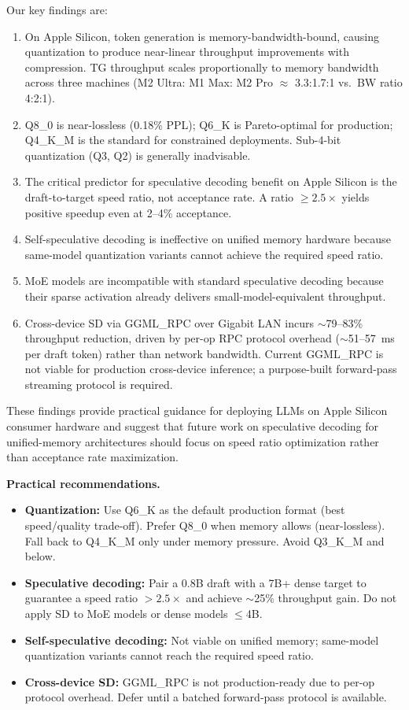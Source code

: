\documentclass[11pt,a4paper]{article}
\begin{document}
Our key findings are:
\begin{enumerate}
  \item On Apple Silicon, token generation is memory-bandwidth-bound, causing
    quantization to produce near-linear throughput improvements with compression.
    TG throughput scales proportionally to memory bandwidth across three
    machines (M2 Ultra: M1 Max: M2 Pro $\approx$ 3.3:1.7:1 vs.\ BW ratio 4:2:1).
  \item Q8\_0 is near-lossless (0.18\% PPL); Q6\_K is Pareto-optimal for
    production; Q4\_K\_M is the standard for constrained deployments.
    Sub-4-bit quantization (Q3, Q2) is generally inadvisable.
  \item The critical predictor for speculative decoding benefit on Apple Silicon
    is the draft-to-target speed ratio, not acceptance rate.
    A ratio $\geq 2.5\times$ yields positive speedup even at 2--4\% acceptance.
  \item Self-speculative decoding is ineffective on unified memory hardware
    because same-model quantization variants cannot achieve the required speed
    ratio.
  \item MoE models are incompatible with standard speculative decoding because
    their sparse activation already delivers small-model-equivalent throughput.
  \item Cross-device SD via GGML\_RPC over Gigabit LAN incurs $\sim$79--83\%
    throughput reduction, driven by per-op RPC protocol overhead ($\sim$51--57~ms
    per draft token) rather than network bandwidth.
    Current GGML\_RPC is not viable for production cross-device inference;
    a purpose-built forward-pass streaming protocol is required.
\end{enumerate}

These findings provide practical guidance for deploying LLMs on Apple Silicon
consumer hardware and suggest that future work on speculative decoding for
unified-memory architectures should focus on speed ratio optimization rather
than acceptance rate maximization.

\medskip
\noindent\textbf{Practical recommendations.}
\begin{itemize}[leftmargin=*, itemsep=2pt]
  \item \textbf{Quantization:} Use Q6\_K as the default production format
    (best speed/quality trade-off). Prefer Q8\_0 when memory allows (near-lossless).
    Fall back to Q4\_K\_M only under memory pressure. Avoid Q3\_K\_M and below.
  \item \textbf{Speculative decoding:} Pair a 0.8B draft with a 7B+ dense
    target to guarantee a speed ratio $>2.5\times$ and achieve $\sim$25\%
    throughput gain. Do not apply SD to MoE models or dense models $\leq$4B.
  \item \textbf{Self-speculative decoding:} Not viable on unified memory;
    same-model quantization variants cannot reach the required speed ratio.
  \item \textbf{Cross-device SD:} GGML\_RPC is not production-ready due to
    per-op protocol overhead. Defer until a batched forward-pass protocol
    is available.
\end{itemize}
\end{document}

